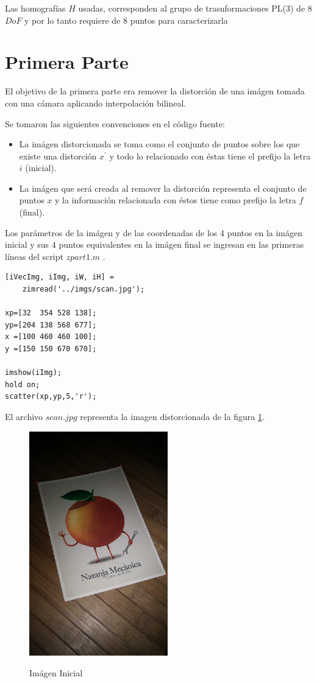 \documentclass{IEEEtran}
\begin{document}
Las homografías $H$ usadas, corresponden al grupo de trasnformaciones
PL(3) de 8 $DoF$ y por lo tanto requiere de 8 puntos para caracterizarla
\cite{hartley2000multiple}

\section{Primera Parte}

El objetivo de la primera parte era remover la distorción de una imágen tomada con
una cámara aplicando interpolación bilineal.

Se tomaron las siguientes convenciones en el código fuente:
\begin{itemize}
\item La imágen distorcionada se toma como el conjunto de
puntos sobre los que existe una distorción $x^{'}$
y todo lo relacionado con éstas tiene el prefijo la letra $i$
(inicial).
\item La imágen que será creada al remover la distorción
representa el conjunto de puntos $x$ y la información
relacionada con éstos tiene como prefijo la letra $f$
(final).
\end{itemize} 

Los parámetros de la imágen y de las coordenadas de los
4 puntos en la imágen inicial y sus 4 puntos equivalentes
en la imágen final se ingresan en las primeras líneas del
script $zpart1.m$ .

\begin{lstlisting}[frame=single]
[iVecImg, iImg, iW, iH] = 
    zimread('../imgs/scan.jpg');

xp=[32  354 528 138];
yp=[204 138 568 677];
x =[100 460 460 100];
y =[150 150 670 670];

imshow(iImg);
hold on; 
scatter(xp,yp,5,'r');
\end{lstlisting}

El archivo $scan.jpg$ representa la imagen distorcionada
de la figura \ref{fig:p1iImg}.

\begin{figure}%
\caption{Imágen Inicial}
\centering
\includegraphics[width=6cm,natwidth=401,natheight=652]{imgs/p1iImg.png}
\label{fig:p1iImg}
\end{figure} 
\end{document}
